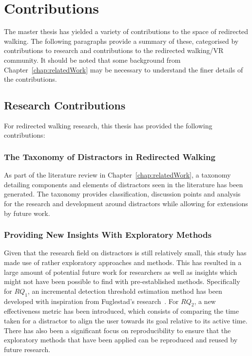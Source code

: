 \section{Contributions}
The master thesis has yielded a variety of contributions to the space of redirected walking. The following paragraphs provide a summary of these, categorised by contributions to research and contributions to the redirected walking/VR community. It should be noted that some background from Chapter~\ref{chap:relatedWork} may be necessary to understand the finer details of the contributions.

\subsection{Research Contributions}
For redirected walking research, this thesis has provided the following contributions: 

\subsubsection{The Taxonomy of Distractors in Redirected Walking}
As part of the literature review in Chapter~\ref{chap:relatedWork}, a taxonomy detailing components and elements of distractors seen in the literature has been generated. The taxonomy provides classification, discussion points and analysis for the research and development around distractors while allowing for extensions by future work. 

\subsubsection{Providing New Insights With Exploratory Methods}
Given that the research field on distractors is still relatively small, this study has made use of rather exploratory approaches and methods. This has resulted in a large amount of potential future work for researchers as well as insights which might not have been possible to find with pre-established methods. Specifically for $RQ_1$, an incremental detection threshold estimation method has been developed with inspiration from Fuglestad's research~\cite{fuglestad2018redirected}. For $RQ_2$, a new effectiveness metric has been introduced, which consists of comparing the time taken for a distractor to align the user towards its goal relative to its active time. There has also been a significant focus on reproducibility to ensure that the exploratory methods that have been applied can be reproduced and reused by future research. 

